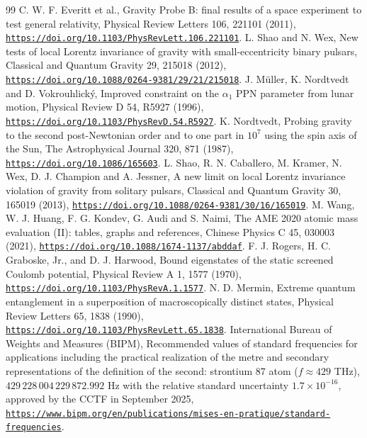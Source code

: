 \documentclass[pdflatex,sn-mathphys-num]{sn-jnl}
\theoremstyle{thmstyleone}
\begin{document}
\begin{thebibliography}{99}
 C. W. F. Everitt et al., Gravity Probe B: final results of a space experiment to test general relativity, Physical Review Letters 106, 221101 (2011), \href{https://doi.org/10.1103/PhysRevLett.106.221101}{\nolinkurl{https://doi.org/10.1103/PhysRevLett.106.221101}}.
 L. Shao and N. Wex, New tests of local Lorentz invariance of gravity with small-eccentricity binary pulsars, Classical and Quantum Gravity 29, 215018 (2012), \href{https://doi.org/10.1088/0264-9381/29/21/215018}{\nolinkurl{https://doi.org/10.1088/0264-9381/29/21/215018}}.
 J. M\"uller, K. Nordtvedt and D. Vokrouhlick\'y, Improved constraint on the $\alpha_1$ PPN parameter from lunar motion, Physical Review D 54, R5927 (1996), \href{https://doi.org/10.1103/PhysRevD.54.R5927}{\nolinkurl{https://doi.org/10.1103/PhysRevD.54.R5927}}.
 K. Nordtvedt, Probing gravity to the second post-Newtonian order and to one part in $10^7$ using the spin axis of the Sun, The Astrophysical Journal 320, 871 (1987), \href{https://doi.org/10.1086/165603}{\nolinkurl{https://doi.org/10.1086/165603}}.
 L. Shao, R. N. Caballero, M. Kramer, N. Wex, D. J. Champion and A. Jessner, A new limit on local Lorentz invariance violation of gravity from solitary pulsars, Classical and Quantum Gravity 30, 165019 (2013), \href{https://doi.org/10.1088/0264-9381/30/16/165019}{\nolinkurl{https://doi.org/10.1088/0264-9381/30/16/165019}}.
 M. Wang, W. J. Huang, F. G. Kondev, G. Audi and S. Naimi, The AME 2020 atomic mass evaluation (II): tables, graphs and references, Chinese Physics C 45, 030003 (2021), \href{https://doi.org/10.1088/1674-1137/abddaf}{\nolinkurl{https://doi.org/10.1088/1674-1137/abddaf}}.
 F. J. Rogers, H. C. Graboske, Jr., and D. J. Harwood, Bound eigenstates of the static screened Coulomb potential, Physical Review A 1, 1577 (1970), \href{https://doi.org/10.1103/PhysRevA.1.1577}{\nolinkurl{https://doi.org/10.1103/PhysRevA.1.1577}}.
 N. D. Mermin, Extreme quantum entanglement in a superposition of macroscopically distinct states, Physical Review Letters 65, 1838 (1990), \href{https://doi.org/10.1103/PhysRevLett.65.1838}{\nolinkurl{https://doi.org/10.1103/PhysRevLett.65.1838}}.
 International Bureau of Weights and Measures (BIPM), Recommended values of standard frequencies for applications including the practical realization of the metre and secondary representations of the definition of the second: strontium 87 atom ($f \approx 429$ THz), $429\,228\,004\,229\,872.992$ Hz with the relative standard uncertainty $1.7 \times 10^{-16}$, approved by the CCTF in September 2025, \href{https://www.bipm.org/en/publications/mises-en-pratique/standard-frequencies}{\nolinkurl{https://www.bipm.org/en/publications/mises-en-pratique/standard-frequencies}}.

\end{thebibliography}
\end{document}
